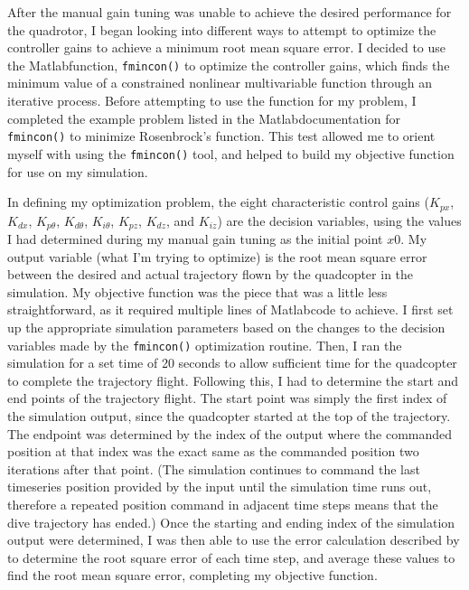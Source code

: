 \documentclass[onecolumn,10pt]{IEEEtran}
\newcommand{\MATLAB}{Matlab}
\begin{document}
After the manual gain tuning was unable to achieve the desired performance for the quadrotor, I began looking into different ways to attempt to optimize the controller gains to achieve a minimum root mean square error. I decided to use the \MATLAB function, \lstinline{fmincon()} to optimize the controller gains, which finds the minimum value of a constrained nonlinear multivariable function through an iterative process. Before attempting to use the function for my problem, I completed the example problem listed in the \MATLAB documentation for \lstinline{fmincon()} to minimize Rosenbrock's function. This test allowed me to orient myself with using the \lstinline{fmincon()} tool, and helped to build my objective function for use on my simulation. 

In defining my optimization problem, the eight characteristic control gains ($K_{px}$, $K_{dx}$, $K_{p\theta}$, $K_{d\theta}$, $K_{i\theta}$, $K_{pz}$, $K_{dz}$, and $K_{iz}$) are the decision variables, using the values I had determined during my manual gain tuning as the initial point $x0$. My output variable (what I'm trying to optimize) is the root mean square error between the desired and actual trajectory flown by the quadcopter in the simulation. My objective function was the piece that was a little less straightforward, as it required multiple lines of \MATLAB code to achieve. I first set up the appropriate simulation parameters based on the changes to the decision variables made by the \lstinline{fmincon()} optimization routine. Then, I ran the simulation for a set time of 20 seconds to allow sufficient time for the quadcopter to complete the trajectory flight. Following this, I had to determine the start and end points of the trajectory flight. The start point was simply the first index of the simulation output, since the quadcopter started at the top of the trajectory. The endpoint was determined by the index of the output where the commanded position at that index was the exact same as the commanded position two iterations after that point. (The simulation continues to command the last timeseries position provided by the input until the simulation time runs out, therefore a repeated position command in adjacent time steps means that the dive trajectory has ended.) Once the starting and ending index of the simulation output were determined, I was then able to use the error calculation described by  to determine the root square error of each time step, and average these values to find the root mean square error, completing my objective function.
\end{document}
